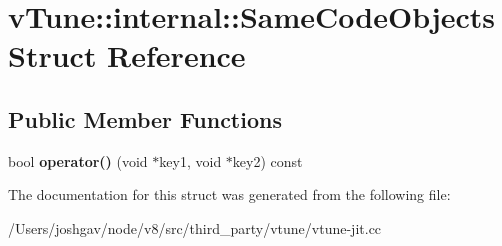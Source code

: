 \hypertarget{structv_tune_1_1internal_1_1_same_code_objects}{}\section{v\+Tune\+:\+:internal\+:\+:Same\+Code\+Objects Struct Reference}
\label{structv_tune_1_1internal_1_1_same_code_objects}
\subsection*{Public Member Functions}
\begin{DoxyCompactItemize}
\item 
bool {\bfseries operator()} (void $\ast$key1, void $\ast$key2) const \hypertarget{structv_tune_1_1internal_1_1_same_code_objects_a6d00d31380288f64ad810bb7e4cb080d}{}\label{structv_tune_1_1internal_1_1_same_code_objects_a6d00d31380288f64ad810bb7e4cb080d}

\end{DoxyCompactItemize}


The documentation for this struct was generated from the following file\+:\begin{DoxyCompactItemize}
\item 
/\+Users/joshgav/node/v8/src/third\+\_\+party/vtune/vtune-\/jit.\+cc\end{DoxyCompactItemize}
